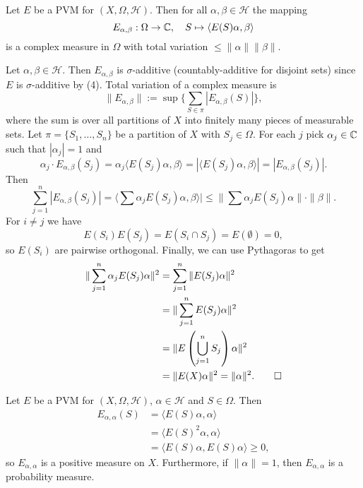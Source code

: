 \begin{lemma}
  Let $E$ be a PVM for $(X, \Omega, \mathcal{H})$. Then for all $\alpha, \beta \in \mathcal{H}$ the mapping 
  $$E_{\alpha, \beta} : \Omega \to \mathbb {C},\quad S \mapsto \langle E(S) \alpha, \beta\rangle$$
  is a complex measure in $\Omega$ with total variation $\leq \|\alpha\| \|\beta\|.$
\end{lemma}

\begin{myproof}
  Let $\alpha, \beta \in \mathcal{H}$. Then $E_{\alpha, \beta}$ is $\sigma$-additive
  (countably-additive for disjoint sets) since $E$ is $\sigma$-additive by (4).
  Total variation of a complex measure is 
  $$\| E_{\alpha, \beta} \| := \sup \{\sum_{S \in \pi} |E_{\alpha, \beta} (S)|\},$$
  where the sum is over all partitions of $X$ into finitely many pieces of measurable sets.
  Let $\pi = \{S_1, \dots, S_n\}$ be a partition of $X$ with $S_j \in \Omega$.
  For each $j$ pick $\alpha_j \in \mathbb {C}$ such that $|\alpha_j| = 1$ and 
  $$\alpha_j \cdot E_{\alpha, \beta} (S_j) = \alpha_j \langle E(S_j)\alpha, \beta\rangle = |\langle E(S_j) \alpha, \beta\rangle| = |E_{\alpha, \beta} (S_j)|.$$
  Then $$\sum_{j = 1} ^n |E_{\alpha, \beta} (S_j)| = \langle \sum \alpha_j E(S_j) \alpha, \beta\rangle| \leq \| \sum \alpha_j E(S_j) \alpha\| \cdot \|\beta\|.$$
  For $i \neq j$ we have $$E(S_i) E(S_j) = E(S_i \cap S_j) = E(\emptyset) = 0,$$
  so $E(S_i)$ are pairwise orthogonal. Finally, we can use Pythagoras to get 
  \begin{align*}
    \| \sum_{j = 1} ^n \alpha_j E(S_j) \alpha\|^2 &= \sum_{j = 1} ^n \| E(S_j) \alpha\|^2\\
    &= \| \sum_{j = 1} ^n E(S_j) \alpha\|^2\\
    &= \| E\left(\bigcup_{j = 1} ^n S_j\right) \alpha\|^2\\
    &= \| E(X) \alpha\|^2 = \|\alpha \|^2. \qedhere
  \end{align*}
\end{myproof}

\begin{remark}
  Let $E$ be a PVM for $(X, \Omega, \mathcal{H})$, $\alpha \in \mathcal{H}$ and $S \in \Omega$.
  Then \begin{align*}
    E_{\alpha, \alpha} (S) &= \langle E(S) \alpha, \alpha\rangle\\
    &= \langle E(S)^2 \alpha, \alpha\rangle\\
    &= \langle E(S) \alpha, E(S) \alpha\rangle \geq 0,
  \end{align*}
  so $E_{\alpha, \alpha}$ is a positive measure on $X$.
  Furthermore, if $\|\alpha\| = 1$, then $E_{\alpha, \alpha}$ is a probability measure.
\end{remark}


